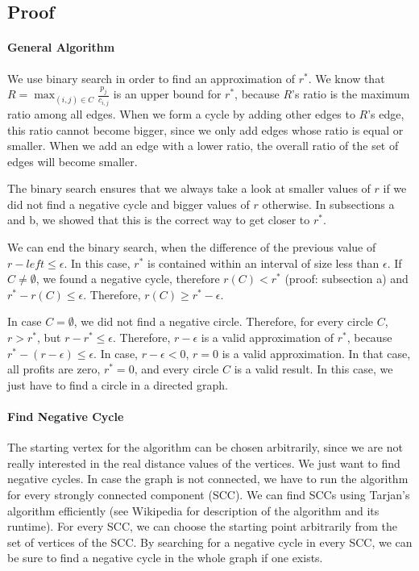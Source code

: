 \documentclass[12pt]{article}
\begin{document}
\subsection*{Proof}
\paragraph{General Algorithm}
We use binary search in order to find an approximation of $r^*$. We know that $R = \max_{(i,j) \in C} \frac{p_j}{c_{i,j}}$ is an upper bound for $r^*$, because $R$'s ratio is the maximum ratio among all edges. When we form a cycle by adding other edges to $R$'s edge, this ratio cannot become bigger, since we only add edges whose ratio is equal or smaller. When we add an edge with a lower ratio, the overall ratio of the set of edges will become smaller.

The binary search ensures that we always take a look at smaller values of $r$ if we did not find a negative cycle and bigger values of $r$ otherwise. In subsections a and b, we showed that this is the correct way to get closer to $r^*$.

We can end the binary search, when the difference of the previous value of $r - \mathit{left} \leq \epsilon$. In this case, $r^*$ is contained within an interval of size less than $\epsilon$. If $C \not= \emptyset$, we found a negative cycle, therefore $r(C) < r^*$ (proof: subsection a) and $r^* - r(C) \leq \epsilon$. Therefore, $r(C) \geq r^* - \epsilon$.

In case $C = \emptyset$, we did not find a negative circle. Therefore, for every circle $C$, $r > r^*$, but $r - r^* \leq \epsilon$. Therefore, $r - \epsilon$ is a valid approximation of $r^*$, because $r^* - (r - \epsilon) \leq \epsilon$. In case, $r - \epsilon < 0$, $r=0$ is a valid approximation. In that case, all profits are zero, $r^*=0$, and every circle $C$ is a valid result. In this case, we just have to find a circle in a directed graph.

\paragraph{Find Negative Cycle}
The starting vertex for the algorithm can be chosen arbitrarily, since we are not really interested in the real distance values of the vertices. We just want to find negative cycles. In case the graph is not connected, we have to run the algorithm for every strongly connected component (SCC). We can find SCCs using Tarjan's algorithm efficiently (see Wikipedia for description of the algorithm and its runtime). For every SCC, we can choose the starting point arbitrarily from the set of vertices of the SCC. By searching for a negative cycle in every SCC, we can be sure to find a negative cycle in the whole graph if one exists.
\end{document}
